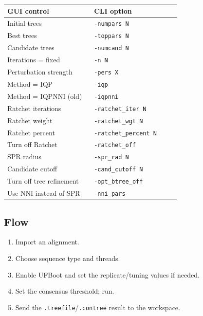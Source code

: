 \documentclass[11pt]{report}
\begin{document}
{\footnotesize
\begin{longtable}{@{}>{\raggedright\arraybackslash}p{0.47\linewidth}>{\raggedright\arraybackslash}p{0.47\linewidth}@{}}
\toprule
GUI control & CLI option \\
\midrule
\endhead
Initial trees & \texttt{-numpars N} \\
Best trees & \texttt{-toppars N} \\
Candidate trees & \texttt{-numcand N} \\
Iterations = fixed & \texttt{-n N} \\
Perturbation strength & \texttt{-pers X} \\
Method = IQP & \texttt{-iqp} \\
Method = IQPNNI (old) & \texttt{-iqpnni} \\
Ratchet iterations & \texttt{-ratchet\_\allowbreak iter N} \\
Ratchet weight & \texttt{-ratchet\_\allowbreak wgt N} \\
Ratchet percent & \texttt{-ratchet\_\allowbreak percent N} \\
Turn off Ratchet & \texttt{-ratchet\_\allowbreak off} \\
SPR radius & \texttt{-spr\_\allowbreak rad N} \\
Candidate cutoff & \texttt{-cand\_\allowbreak cutoff N} \\
Turn off tree refinement & \texttt{-opt\_\allowbreak btree\_\allowbreak off} \\
Use NNI instead of SPR & \texttt{-nni\_\allowbreak pars} \\
\bottomrule
\end{longtable}
}

\subsection{Flow}

\begin{enumerate}
  \item Import an alignment.
  \item Choose sequence type and threads.
  \item Enable UFBoot and set the replicate/tuning values if needed.
  \item Set the consensus threshold; run.
  \item Send the \texttt{.\allowbreak treefile}/\texttt{.\allowbreak contree} result to the workspace.
\end{enumerate}
\end{document}
